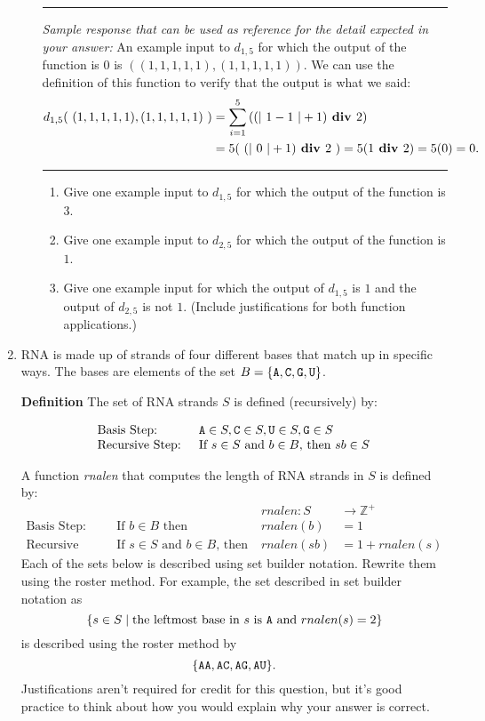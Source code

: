 \documentclass[12pt, oneside]{article}
\begin{document}
\begin{enumerate}
\begin{enumerate}
\rule{0.5\textwidth}{.4pt}

{\it Sample response that can be used as reference for the detail expected 
in your answer:} An example input to $d_{1,5}$ for which the output of the function is $0$ is 
$( (1,1,1,1,1), (1,1,1,1,1) )$.  We can use the definition of this function to verify that the output is what we said:
\begin{align*}
d_{1,5} (~ (1,1,1,1,1), (1,1,1,1,1) ~) &=   \sum_{i=1}^5\left( (\lvert~1-1~\rvert + 1) \textbf{ div } 2 \right) \\
&=5(~(\lvert~0~\rvert+1) \textbf{ div } 2~) = 5 (1 \textbf{ div } 2) = 5 (0) = 0.
\end{align*}

\rule{0.5\textwidth}{.4pt}

\begin{enumerate}
\item Give one example input to $d_{1,5}$ for which the output of the function is $3$.
\item Give one example input to $d_{2,5}$ for which the output of the function is $1$.
\item Give one example input for which the output of $d_{1,5}$ is $1$ and the output of 
$d_{2,5}$ is not $1$. (Include justifications for both function applications.)
\end{enumerate}

\end{enumerate}


\item RNA is made up of strands of four different bases that match up in
specific ways. The bases are elements of the set 
$B  = \{\texttt{A}, \texttt{C}, \texttt{G}, \texttt{U} \}$.

{\bf Definition} The set of RNA strands $S$ is defined (recursively) by:

\[
\begin{array}{ll}
\textrm{Basis Step: } & \texttt{A} \in S, \texttt{C} \in S, \texttt{U} \in S, \texttt{G} \in S \\
\textrm{Recursive Step: } & \textrm{If } s \in S\textrm{ and }b \in B \textrm{, then }sb \in S
\end{array}
\]

A function \textit{rnalen} that computes the length of RNA strands in $S$ is defined by:
\[
\begin{array}{llll}
& & \textit{rnalen} : S & \to \mathbb{Z}^+ \\
\textrm{Basis Step:} & \textrm{If } b \in B\textrm{ then } & \textit{rnalen}(b) & = 1 \\
\textrm{Recursive Step:} & \textrm{If } s \in S\textrm{ and }b \in B\textrm{, then  } & \textit{rnalen}(sb) & = 1 + \textit{rnalen}(s)
\end{array}
\]Each of the sets below is described using set builder notation.  Rewrite them using the roster method.
For example, the set described in set builder notation as
\[
\{ s \in S \mid \text{the leftmost base in $s$ is $\texttt{A}$ and $rnalen(s) = 2$} \} 
\]
is described using the roster method by
\[
\{ \texttt{A}\texttt{A} , \texttt{A}\texttt{C} , \texttt{A}\texttt{G}, \texttt{A}\texttt{U}\}.
\]
Justifications aren't required for credit for this question,
but it's good practice to think about how you would explain why your answer is correct.


\end{enumerate}
\end{document}
